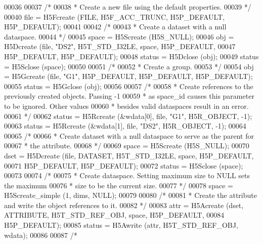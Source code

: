 \begin{DoxyCode}
00036 
00037     \textcolor{comment}{/*}
00038 \textcolor{comment}{     * Create a new file using the default properties.}
00039 \textcolor{comment}{     */}
00040     file = H5Fcreate (FILE, H5F\_ACC\_TRUNC, H5P\_DEFAULT, H5P\_DEFAULT);
00041 
00042     \textcolor{comment}{/*}
00043 \textcolor{comment}{     * Create a dataset with a null dataspace.}
00044 \textcolor{comment}{     */}
00045     space = H5Screate (H5S\_NULL);
00046     obj = H5Dcreate (file, \textcolor{stringliteral}{"DS2"}, H5T\_STD\_I32LE, space, H5P\_DEFAULT,
00047                 H5P\_DEFAULT, H5P\_DEFAULT);
00048     status = H5Dclose (obj);
00049     status = H5Sclose (space);
00050 
00051     \textcolor{comment}{/*}
00052 \textcolor{comment}{     * Create a group.}
00053 \textcolor{comment}{     */}
00054     obj = H5Gcreate (file, \textcolor{stringliteral}{"G1"}, H5P\_DEFAULT, H5P\_DEFAULT, H5P\_DEFAULT);
00055     status = H5Gclose (obj);
00056 
00057     \textcolor{comment}{/*}
00058 \textcolor{comment}{     * Create references to the previously created objects.  Passing -1}
00059 \textcolor{comment}{     * as space\_id causes this parameter to be ignored.  Other values}
00060 \textcolor{comment}{     * besides valid dataspaces result in an error.}
00061 \textcolor{comment}{     */}
00062     status = H5Rcreate (&wdata[0], file, \textcolor{stringliteral}{"G1"}, H5R\_OBJECT, -1);
00063     status = H5Rcreate (&wdata[1], file, \textcolor{stringliteral}{"DS2"}, H5R\_OBJECT, -1);
00064 
00065     \textcolor{comment}{/*}
00066 \textcolor{comment}{     * Create dataset with a null dataspace to serve as the parent for}
00067 \textcolor{comment}{     * the attribute.}
00068 \textcolor{comment}{     */}
00069     space = H5Screate (H5S\_NULL);
00070     dset = H5Dcreate (file, DATASET, H5T\_STD\_I32LE, space, H5P\_DEFAULT,
00071                 H5P\_DEFAULT, H5P\_DEFAULT);
00072     status = H5Sclose (space);
00073 
00074     \textcolor{comment}{/*}
00075 \textcolor{comment}{     * Create dataspace.  Setting maximum size to NULL sets the maximum}
00076 \textcolor{comment}{     * size to be the current size.}
00077 \textcolor{comment}{     */}
00078     space = H5Screate\_simple (1, dims, NULL);
00079 
00080     \textcolor{comment}{/*}
00081 \textcolor{comment}{     * Create the attribute and write the object references to it.}
00082 \textcolor{comment}{     */}
00083     attr = H5Acreate (dset, ATTRIBUTE, H5T\_STD\_REF\_OBJ, space, H5P\_DEFAULT,
00084                     H5P\_DEFAULT);
00085     status = H5Awrite (attr, H5T\_STD\_REF\_OBJ, wdata);
00086 
00087     \textcolor{comment}{/*}

\end{DoxyCode}
